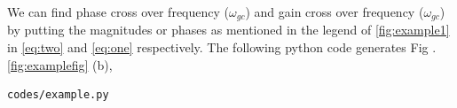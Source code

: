 \begin{enumerate}[label=\thesection.\arabic*.,ref=\thesection.\theenumi]
We can find phase cross over frequency ($\omega_{gc}$) and gain cross over frequency ($\omega_{gc}$) by putting the magnitudes or phases as mentioned in the legend of \ref{fig:example1} in \eqref{eq:two}
and \eqref{eq:one} respectively.
The following python code generates  Fig . \ref{fig:examplefig} (b),
\begin{lstlisting}
codes/example.py
\end{lstlisting}


\end{enumerate}
